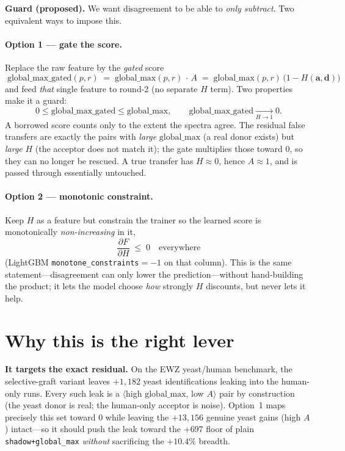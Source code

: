 \documentclass[11pt]{article}
\newcommand{\code}[1]{\texttt{\small #1}}
\begin{document}
\textbf{Guard (proposed).} We want disagreement to be able to \emph{only subtract}. Two equivalent
ways to impose this.

\paragraph{Option 1 — gate the score.} Replace the raw feature by the \emph{gated} score
\[
\boxed{\;\mathrm{global\_max\_gated}(p,r) \;=\; \mathrm{global\_max}(p,r)\,\cdot\,A
\;=\; \mathrm{global\_max}(p,r)\,\bigl(1-H(\mathbf a,\mathbf d)\bigr)\;}
\]
and feed \emph{that} single feature to round-2 (no separate $H$ term). Two properties make it a guard:
\[
0\le \mathrm{global\_max\_gated}\le \mathrm{global\_max},
\qquad
\mathrm{global\_max\_gated}\xrightarrow[H\to 1]{}0 .
\]
A borrowed score counts only to the extent the spectra agree. The residual false transfers are exactly
the pairs with \emph{large} $\mathrm{global\_max}$ (a real donor exists) but \emph{large} $H$ (the
acceptor does not match it); the gate multiplies those toward $0$, so they can no longer be rescued.
A true transfer has $H\!\approx\!0$, hence $A\!\approx\!1$, and is passed through essentially untouched.

\paragraph{Option 2 — monotonic constraint.} Keep $H$ as a feature but constrain the trainer so the
learned score is monotonically \emph{non-increasing} in it,
\[
\frac{\partial F}{\partial H}\;\le\;0 \quad\text{everywhere}
\]
(LightGBM \code{monotone\_constraints}$=-1$ on that column). This is the same statement---disagreement
can only lower the prediction---without hand-building the product; it lets the model choose \emph{how}
strongly $H$ discounts, but never lets it help.

\section{Why this is the right lever}
\textbf{It targets the exact residual.} On the EWZ yeast/human benchmark, the selective-graft variant
leaves $+1{,}182$ yeast identifications leaking into the human-only runs. Every such leak is a
$\langle$high $\mathrm{global\_max}$, low $A\rangle$ pair by construction (the yeast donor is real; the
human-only acceptor is noise). Option~1 maps precisely this set toward $0$ while leaving the
$+13{,}156$ genuine yeast gains (high $A$) intact---so it should push the leak toward the $+697$ floor
of plain \code{shadow+global\_max} \emph{without} sacrificing the $+10.4\%$ breadth.
\end{document}
